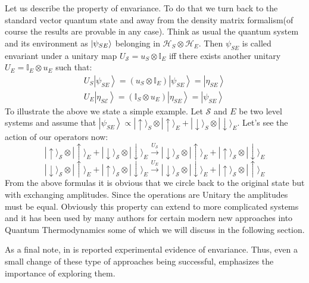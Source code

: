 \documentclass[a4paper,12pt]{article}
\begin{document}
\par
Let us describe the property of envariance. To do that we turn back to the standard vector quantum state and away from the density matrix formalism(of course the results are provable in any case). Think as usual the quantum system and its environment
as $\ket{\psi_{SE}}$ belonging in
$\mathcal{H}_S \otimes \mathcal{H}_E$. Then $\psi_{SE}$ is called envariant under a unitary map $U_{\mathcal{S}}=u_{S} \otimes \mathbb{I}_{E}$ iff there exists another unitary $U_{E}= \mathbb{I}_{E} \otimes u_{E} $ such that:
\begin{equation}
\begin{array}{l}
U_{S}\left|\psi_{S E}\right\rangle=\left(u_{S} \otimes \mathbb{I}_{E}\right)\left|\psi_{S E}\right\rangle=\left|\eta_{S E}\right\rangle \\
U_{E}\left|\eta_{S \mathcal{E}}\right\rangle=\left(\mathbb{I}_{S} \otimes u_{E}\right)\left|\eta_{S E}\right\rangle=\left|\psi_{S E}\right\rangle
\end{array}
\end{equation}
To illustrate the above we state a simple example. Let $\mathcal{S}$ and $E$ be two level systems and assume that $\left|\psi_{SE}\right\rangle \propto|\uparrow\rangle_{S} \otimes|\uparrow\rangle_{E}+|\downarrow\rangle_{S} \otimes|\downarrow\rangle_{E}$. Let's see the action of our operators now:
\begin{equation}
|\uparrow\rangle_{\mathcal{S}} \otimes|\uparrow\rangle_{E}+|\downarrow\rangle_{\mathcal{S}} \otimes|\downarrow\rangle_{E} \stackrel{U_{\mathcal{S}}}{\longrightarrow}|\downarrow\rangle_{\mathcal{S}} \otimes|\uparrow\rangle_{E}+|\uparrow\rangle_{\mathcal{S}} \otimes|\downarrow\rangle_{E}
\end{equation}
\begin{equation}
|\downarrow\rangle_{\mathcal{S}} \otimes|\uparrow\rangle_{E}+|\uparrow\rangle_{\mathcal{S}} \otimes|\downarrow\rangle_{E} \stackrel{U_{E}}{\longrightarrow}|\downarrow\rangle_{\mathcal{S}} \otimes|\downarrow\rangle_{E}+|\uparrow\rangle_{\mathcal{S}} \otimes|\uparrow\rangle_{E}
\end{equation}
From the above formulas it is obvious that we circle back to the original state but with exchanging amplitudes. Since the operations are Unitary the amplitudes must be equal. Obviously this property can extend to more complicated systems and it has been used by many authors for certain modern new approaches into Quantum Thermodynamics some of which we will discuss in the following section. 
\par As a final note, in \cite{vermeyden2015experimental} is reported experimental evidence of envariance. Thus, even a small change of these type of approaches being successful, emphasizes the importance of exploring them.
\end{document}
